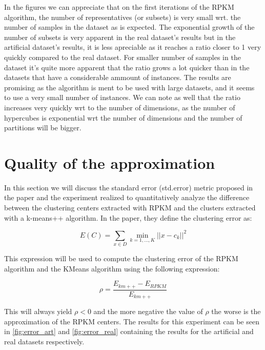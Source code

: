 In the figures we can appreciate that on the first iterations of the RPKM algorithm, the number of representatives (or subsets) is very small wrt. the number of samples in the dataset as is expected. The exponential growth of the number of subsets is very apparent in the real dataset's results but in the artificial dataset's results, it is less apreciable as it reaches a ratio closer to 1 very quickly compared to the real dataset. For smaller number of samples in the dataset it's quite more apparent that the ratio grows a lot quicker than in the datasets that have a considerable ammount of instances. The results are promising as the algorithm is ment to be used with large datasets, and it seems to use a very small number of instances. We can note as well that the ratio increases very quickly wrt to the number of dimensions, as the number of hypercubes is exponential wrt the number of dimensions and the number of partitions will be bigger.

\section{Quality of the approximation}

In this section we will discuss the standard error (std.error) metric proposed in the paper and the experiment realized to quantitatively analyze the difference between the clustering centers extracted with RPKM and the clusters extracted with a k-means++ algorithm. In the paper, they define the clustering error as:

$$E(C) = \sum_{x \in D} \min_{k=1,\dots,K}||x-c_k||^2$$

This expression will be used to compute the clustering error of the RPKM algorithm and the KMeans algorithm using the following expression:

$$\rho = \frac{E_{km++} - E_{RPKM}}{E_{km++}}$$

This will always yield $\rho < 0$ and the more negative the value of $\rho$ the worse is the approximation of the RPKM centers. The results for this experiment can be seen in \ref{fig:error_art} and \ref{fig:error_real} containing the results for the artificial and real datasets respectively.

